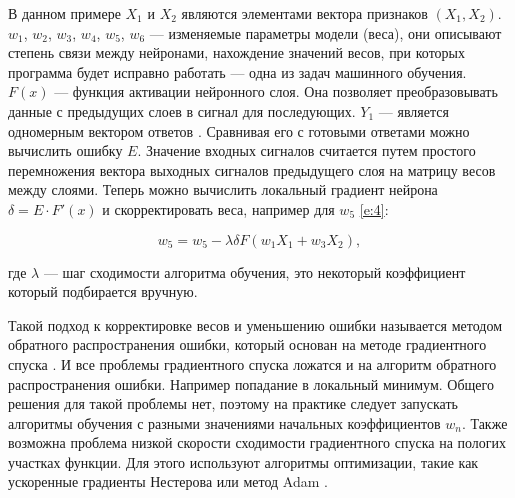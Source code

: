 В данном примере $X_{1}$ и $X_{2}$ являются элементами вектора признаков $(X_{1},  X_{2})$. 
$w_{1}$, $w_{2}$, $w_{3}$, $w_{4}$, $w_{5}$, $w_{6}$ — изменяемые параметры модели (веса), они описывают степень связи между нейронами, нахождение значений весов, при которых программа будет исправно работать — одна из задач машинного обучения. $F(x)$ — функция активации нейронного слоя.  Она позволяет преобразовывать данные с предыдущих слоев в сигнал для последующих. $Y_{1}$ — является одномерным вектором ответов \cite{4}. Сравнивая его с готовыми ответами можно вычислить ошибку $E$. Значение входных сигналов считается путем простого перемножения вектора выходных сигналов предыдущего слоя на матрицу весов между слоями. Теперь можно вычислить локальный градиент нейрона $\delta = E \cdot F'(x)$ и скорректировать веса, например для $w_{5}$ \ref{e:4}:

\begin{equation} \label{e:4}
w_{5} = w_{5} - \lambda \delta F(w_{1}X_{1} + w_{3}X_{2}),
\end{equation}


где $\lambda$ — шаг сходимости алгоритма обучения, это некоторый коэффициент который подбирается вручную.

Такой подход к корректировке весов и уменьшению ошибки называется методом обратного распространения ошибки, который основан на методе градиентного спуска \cite{1}. И все проблемы градиентного спуска ложатся и на алгоритм обратного распространения ошибки. Например попадание в локальный минимум. Общего решения для такой проблемы нет, поэтому на практике следует запускать алгоритмы обучения с разными значениями начальных коэффициентов $w_{n}$. Также возможна проблема низкой скорости сходимости градиентного спуска на пологих участках функции. Для этого используют алгоритмы оптимизации, такие как ускоренные градиенты Нестерова или метод Adam \cite{2}.